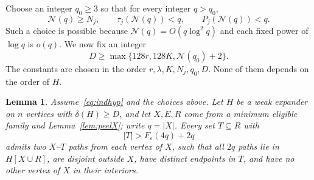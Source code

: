 \documentclass[10pt,letterpaper]{article}
\newtheorem{lemma}[theorem]{Lemma}
\theoremstyle{definition}
\theoremstyle{remark}
\newcommand{\eps}{\varepsilon}
\begin{document}
Choose an integer $q_0\ge3$ so that for every integer $q>q_0$,
\begin{equation}\label{eq:q0}
\mathcal N(q)\ge N_j,\qquad
\tau_j(\mathcal N(q))<q,\qquad
P_j(\mathcal N(q))<q.
\end{equation}
Such a choice is possible because $\mathcal N(q)=O(q\log^2q)$ and each fixed power of $\log q$ is $o(q)$. We now fix an integer
\begin{equation}\label{eq:D}
D\ge\max\{128r,128K,\mathcal N(q_0)+2\}.
\end{equation}
The constants are chosen in the order $r,\lambda,K,N_j,q_0,D$. None of them depends on the order of $H$.

\begin{lemma}\label{lem:fullfan}
Assume~\eqref{eq:indhyp} and the choices above. Let $H$ be a weak expander on $n$ vertices with $\delta(H)\ge D$, and let $X,E,R$ come from a minimum eligible family and Lemma~\ref{lem:peelX}; write $q=|X|$. Every set $T\subseteq R$ with
\begin{equation}\label{eq:target}
|T|>F_\eps(4q)+2q
\end{equation}
admits two $X$--$T$ paths from each vertex of $X$, such that all $2q$ paths lie in $H[X\cup R]$, are disjoint outside $X$, have distinct endpoints in $T$, and have no other vertex of $X$ in their interiors.
\end{lemma}
\end{document}
